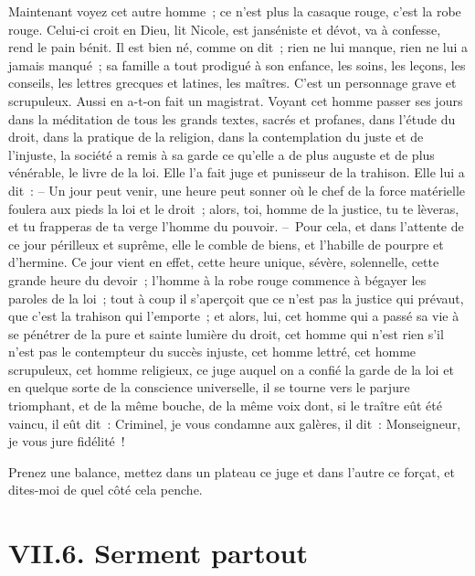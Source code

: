 \documentclass[french,twoside]{book} %
\begin{document}
Maintenant voyez cet autre homme ; ce n’est plus la casaque rouge, c’est la robe rouge. Celui-ci croit en Dieu, lit Nicole, est janséniste et dévot, va à confesse, rend le pain bénit. Il est bien né, comme on dit ; rien ne lui manque, rien ne lui a jamais manqué ; sa famille a tout prodigué à son enfance, les soins, les leçons, les conseils, les lettres grecques et latines, les maîtres. C’est un personnage grave et scrupuleux. Aussi en a-t-on fait un magistrat. Voyant cet homme passer ses jours dans la méditation de tous les grands textes, sacrés et profanes, dans l’étude du droit, dans la pratique de la religion, dans la contemplation du juste et de l’injuste, la société a remis à sa garde ce qu’elle a de plus auguste et de plus vénérable, le livre de la loi. Elle l’a fait juge et punisseur de la trahison. Elle lui a dit : – Un jour peut venir, une heure peut sonner où le chef de la force matérielle foulera aux pieds la loi et le droit ; alors, toi, homme de la justice, tu te lèveras, et tu frapperas de ta verge l’homme du pouvoir. – Pour cela, et dans l’attente de ce jour périlleux et suprême, elle le comble de biens, et l’habille de pourpre et d’hermine. Ce jour vient en effet, cette heure unique, sévère, solennelle, cette grande heure du devoir ; l’homme à la robe rouge commence à bégayer les paroles de la loi ; tout à coup il s’aperçoit que ce n’est pas la justice qui prévaut, que c’est la trahison qui l’emporte ; et alors, lui, cet homme qui a passé sa vie à se pénétrer de la pure et sainte lumière du droit, cet homme qui n’est rien s’il n’est pas le contempteur du succès injuste, cet homme lettré, cet homme scrupuleux, cet homme religieux, ce juge auquel on a confié la garde de la loi et en quelque sorte de la conscience universelle, il se tourne vers le parjure triomphant, et de la même bouche, de la même voix dont, si le traître eût été vaincu, il eût dit : Criminel, je vous condamne aux galères, il dit : Monseigneur, je vous jure fidélité !\par
Prenez une balance, mettez dans un plateau ce juge et dans l’autre ce forçat, et dites-moi de quel côté cela penche.

\section[{VII.6. Serment partout}]{VII.6. Serment partout}
\end{document}
